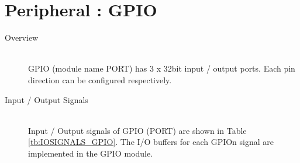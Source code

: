\section{Peripheral : GPIO}

\begin{description}

    \item[Overview]\mbox{}\\
        GPIO (module name PORT) has 3 x 32bit input / output ports. Each pin direction can be configured respectively.             

    \item[Input / Output Signals]\mbox{}\\
        Input / Output signals of GPIO (PORT) are shown in Table \ref{tb:IOSIGNALS_GPIO}. The I/O buffers for each GPIOn signal are implemented in the GPIO module.
        

\end{description}
